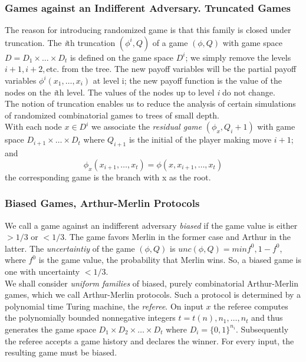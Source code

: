 \documentclass{beamer}
\begin{document}
\begin{frame}
\frametitle{Games against an Indifferent Adversary. Truncated Games}
The reason for introducing randomized game is that this family is closed under truncation. The \textit{i}th truncation $(\phi^i, Q)$ of a game $(\phi, Q)$ with game space $D = D_1 \times \ldots \times D_t$  is defined on the game space $D^i$; we simply remove the levels $i+1, i+2,$etc. from the tree. The new payoff variables will be the partial payoff variables $\phi^i(x_1,\ldots,x_i)$ at level i; the new payoff function is the value of the nodes on the \textit{i}th level. The values of the nodes up to level \textit{i} do not change.\\
The notion of truncation enables us to reduce the analysis of certain simulations of randomized combinatorial games to trees of small depth.\\
With each node $x \in D^i$ we associate the \textit{residual game} $(\phi_x, Q_i+1)$ with game space $D_{i+1}\times\ldots\times D_{t}$ where $Q_{i+1}$ is the initial of the player making move $i+1$; and $$\phi_x(x_{i+1},\ldots,x_t) = \phi(x,x_{i+1},\ldots,x_t)$$ the corresponding game is the branch with x as the root.
\end{frame}

\begin{frame}
\frametitle{Biased Games, Arthur-Merlin Protocols}
We call a game against an indifferent adversary \textit{biased} if the game value is either $>1/3$ or $< 1/3$. The game favors Merlin in the former case and Arthur in the latter. The \textit{uncertaintiy} of the game $(\phi, Q)$ is $unc(\phi, Q) = min {f^0, 1- f^0}$, where $f^0$ is the game value, the probability that Merlin wins. So, a biased game is one with uncertainty $<1/3$.\\
We shall consider \textit{uniform families} of biased, purely combinatorial Arthur-Merlin games, which we call Arthur-Merlin protocols. Such a protocol is determined by a polynomial time Turing machine, the \textit{referee}. On input $x$ the referee computes the polynomially bounded nonnegative integers $t = t(n), n_1,\ldots,n_t$ and thus generates the game space $D_1 \times D_2 \times \ldots \times D_t$ where $D_i = \{0, 1\}^{n_i}$. Subsequently the referee accepts a game history and declares the winner. For every input, the resulting game must be biased. 
\end{frame}
\end{document}
